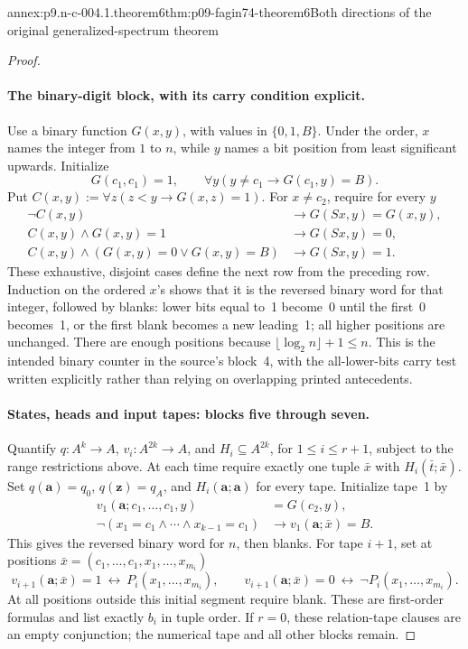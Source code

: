 \begin{annexitem}{annex:p9.n-c-004.1.theorem6}{thm:p09-fagin74-theorem6}{Both directions of the original generalized-spectrum theorem}
\begin{proof}
\paragraph{The binary-digit block, with its carry condition explicit.}
Use a binary function \(G(x,y)\), with values in \(\{0,1,B\}\).
Under the order, \(x\) names the integer from \(1\) to \(n\), while
\(y\) names a bit position from least significant upwards.  Initialize
\[
 G(c_1,c_1)=1,\qquad \forall y(y\ne c_1\to G(c_1,y)=B).
\]
Put \(C(x,y):=\forall z(z<y\to G(x,z)=1)\).
For \(x\ne c_2\), require for every \(y\)
\[
 \begin{array}{ll}
 \neg C(x,y) &\to G(Sx,y)=G(x,y),\\
 C(x,y)\land G(x,y)=1 &\to G(Sx,y)=0,\\
 C(x,y)\land(G(x,y)=0\lor G(x,y)=B)&\to G(Sx,y)=1.
 \end{array}
\]
These exhaustive, disjoint cases define the next row from the preceding row.
Induction on the ordered \(x\)'s shows that it is the reversed binary word
for that integer, followed by blanks: lower bits equal to~1 become~0 until
the first~0 becomes~1, or the first blank becomes a new leading~1; all
higher positions are unchanged.  There are enough positions because
\(\lfloor\log_2n\rfloor+1\leq n\).  This is the intended binary
counter in the source's block~4, with the all-lower-bits carry test written
explicitly rather than relying on overlapping printed antecedents.

\paragraph{States, heads and input tapes: blocks five through seven.}
Quantify \(q:A^k\to A\), \(v_i:A^{2k}\to A\), and
\(H_i\subseteq A^{2k}\), for \(1\leq i\leq r+1\), subject to the
range restrictions above.  At each time require exactly one tuple
\(\bar x\) with \(H_i(\bar t;\bar x)\).
Set \(q(\mathbf a)=q_0\), \(q(\mathbf z)=q_A\), and
\(H_i(\mathbf a;\mathbf a)\) for every tape.
Initialize tape~1 by
\[
 \begin{split}
 v_1(\mathbf a;c_1,\ldots,c_1,y)&=G(c_2,y),\\
 \neg(x_1=c_1\land\cdots\land x_{k-1}=c_1)
    &\to v_1(\mathbf a;\bar x)=B.
 \end{split}
\]
This gives the reversed binary word for \(n\), then blanks.
For tape \(i+1\), set at positions
\(\bar x=(c_1,\ldots,c_1,x_1,\ldots,x_{m_i})\)
\[
 v_{i+1}(\mathbf a;\bar x)=1\ \longleftrightarrow\
 P_i(x_1,\ldots,x_{m_i}),
 \qquad
 v_{i+1}(\mathbf a;\bar x)=0\ \longleftrightarrow\
 \neg P_i(x_1,\ldots,x_{m_i}).
\]
At all positions outside this initial segment require blank.  These are
first-order formulas and list exactly \(b_i\) in tuple order.
If \(r=0\), these relation-tape clauses are an empty conjunction;
the numerical tape and all other blocks remain.


\end{proof}
\end{annexitem}

